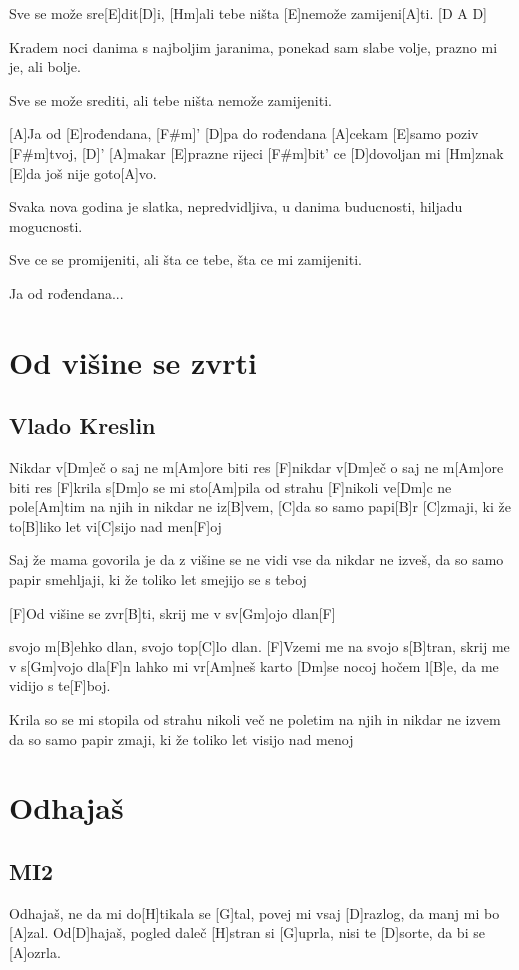 \documentclass[a4paper,12pt]{article}
\begin{document}
\begin{multicols}{2}
\begin{guitar}
[F#m]Sve se može sre[E]dit[D]i,
[Hm]ali tebe ništa [E]nemože zamijeni[A]ti. [D A D]


Kradem noci danima
s najboljim jaranima,
ponekad sam slabe volje,
prazno mi je, ali bolje.


Sve se može srediti,
ali tebe ništa nemože zamijeniti.


[A]Ja od [E]rođendana, [F#m]'
[D]pa do rođendana
[A]cekam [E]samo poziv [F#m]tvoj, [D]'
[A]makar [E]prazne rijeci [F#m]bit' ce
[D]dovoljan mi [Hm]znak [E]da još nije goto[A]vo.


Svaka nova godina
je slatka, nepredvidljiva,
u danima buducnosti,
hiljadu mogucnosti.


Sve ce se promijeniti,
ali šta ce tebe, šta ce mi zamijeniti.


Ja od rođendana...

\end{guitar}
\section{Od višine se zvrti}
\subsection*{Vlado Kreslin}
\begin{guitar}
[F]Nikdar v[Dm]eč o saj ne m[Am]ore biti res
[F]nikdar v[Dm]eč o saj ne m[Am]ore biti res
[F]krila s[Dm]o se mi sto[Am]pila od strahu
[F]nikoli ve[Dm]c ne pole[Am]tim na njih
in nikdar ne iz[B]vem, [C]da so samo papi[B]r
[C]zmaji, ki že to[B]liko let vi[C]sijo nad men[F]oj


Saj že mama govorila je
da z višine se ne vidi vse
da nikdar ne izveš, da so samo papir
smehljaji, ki že toliko let
smejijo se s teboj


[F]Od višine se zvr[B]ti, skrij me v sv[Gm]ojo dlan[F]

svojo m[B]ehko dlan, svojo top[C]lo dlan.
[F]Vzemi me na svojo s[B]tran, skrij me v s[Gm]vojo dla[F]n
lahko mi vr[Am]neš karto [Dm]se nocoj
hočem l[B]e, da me vidijo s te[F]boj.


Krila so se mi stopila od strahu
nikoli več ne poletim na njih
in nikdar ne izvem
da so samo papir
zmaji, ki že toliko let 
visijo nad menoj

\end{guitar}
\section{Odhajaš}
\subsection*{MI2}
\begin{guitar}
[D]Odhajaš, ne da mi do[H]tikala se [G]tal,
povej mi vsaj [D]razlog, da manj mi bo [A]zal.
Od[D]hajaš, pogled daleč [H]stran si [G]uprla,
nisi te [D]sorte, da bi se [A]ozrla.



\end{guitar}
\end{multicols}
\end{document}
